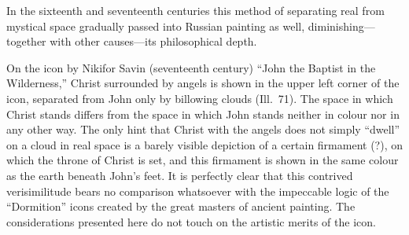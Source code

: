 In the sixteenth and seventeenth centuries this method of separating real from mystical
space gradually passed into Russian painting as well, diminishing---together with other
causes---its philosophical depth.



On the icon by Nikifor Savin (seventeenth century) ``John the Baptist in the Wilderness,''
Christ surrounded by angels is shown in the upper left corner of the icon, separated from
John only by billowing clouds (Ill.~71).  The space in which Christ stands differs from
the space in which John stands neither in colour nor in any other way.  The only hint
that Christ with the angels does not simply ``dwell'' on a cloud in real space is a
barely visible depiction of a certain firmament (?), on which the throne of Christ is
set, and this firmament is shown in the same colour as the earth beneath John's feet.  It
is perfectly clear that this contrived verisimilitude bears no comparison whatsoever with
the impeccable logic of the ``Dormition'' icons created by the great masters of ancient
painting.  The considerations presented here do not touch on the artistic merits of the
icon.



